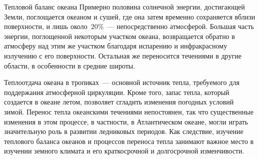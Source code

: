 
\begin{chapter}{Тепловой баланс океана}\label{chap:5}
Примерно половина солнечной энергии, достигающей Земли, поглощается океаном
и сушей, где она затем временно сохраняется вблизи поверхности, и лишь 
около~$20\%$~--- непосредственно 
атмосферой. Большая часть энергии, поглощенной некоторым участком океана, 
возвращается обратно в атмосферу над этим же участком благодаря испарению
и инфракрасному излучению с его поверхности. Остальная же переносится 
течениями в другие области, в особенности в средние широты. 
%

Теплоотдача океана в тропиках~--- основной источник тепла, требуемого для
поддержания атмосферной циркуляции. Кроме того, запас тепла, который создается
в океане летом, позволяет сгладить изменения погодных условий зимой.
Перенос тепла океанскими течениями непостоянен, так что существенные изменения
в этом процессе, в частности, в Атлантическом океане, могли играть 
значительную роль в развитии ледниковых периодов. Как следствие, изучение
теплового баланса океанов и процессов переноса тепла занимают важное место
в изучении земного климата и его краткосрочной и долгосрочной изменчивости.
%


\end{chapter}
